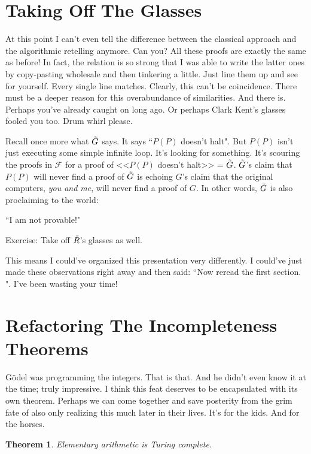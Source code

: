 \documentclass{article}
\newtheorem{theorem}{Theorem}
\newcommand{\F}{\ensuremath{\mathcal{F}}}
\newcommand{\iGoedel}{\ensuremath{\accentset{\scalebox{0.35}{$\infty$}}{G}}}
\newcommand{\iRosser}{\ensuremath{\accentset{\scalebox{0.35}{$\infty$}}{R}}}
\begin{document}
\section{Taking Off The Glasses}

At this point I can't even tell the difference between the classical approach and the algorithmic retelling anymore. Can you? All these proofs are exactly the same as before! In fact, the relation is so strong that I was able to write the latter ones by copy-pasting wholesale and then tinkering a little. Just line them up and see for yourself. Every single line matches. Clearly, this can't be coincidence. There must be a deeper reason for this overabundance of similarities. And there is. Perhaps you've already caught on long ago. Or perhaps Clark Kent's glasses fooled you too. Drum whirl please.

Recall once more what $\iGoedel$ says. It says ``$P(P)$ doesn't halt". But $P(P)$ isn't just executing some simple infinite loop. It's looking for something. It's scouring the proofs in $\F$ for a proof of <<$P(P)$ doesn't halt>> = $\iGoedel$. $\iGoedel$'s claim that $P(P)$ will never find a proof of $\iGoedel$ is echoing $G$'s claim that the original computers, \textit{you and me}, will never find a proof of $G$. In other words, $\iGoedel$ is also proclaiming to the world:
\begin{center}
``I am not provable!"
\end{center}
Exercise: Take off $\iRosser$'s glasses as well.

This means I could've organized this presentation very differently. I could've just made these observations right away and then said: ``Now reread the first section. \scalebox{0.9}{$\square$}". I've been wasting your time!

\section{Refactoring The Incompleteness Theorems}

Gödel was programming the integers. That is that. And he didn't even know it at the time; truly impressive. I think this feat deserves to be encapsulated with its own theorem. Perhaps we can come together and save posterity from the grim fate of also only realizing this much later in their lives. It's for the kids. And for the horses.

\begin{theorem}
Elementary arithmetic is Turing complete.
\end{theorem}
\end{document}
